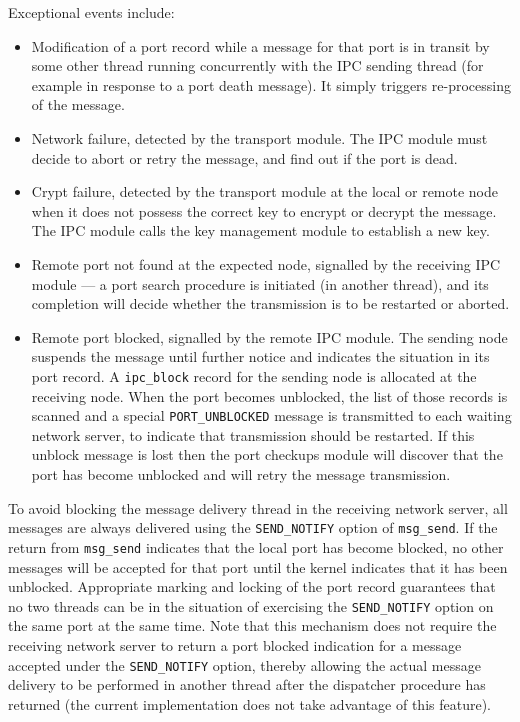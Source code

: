 Exceptional events include:
\begin{itemize} 
\item Modification of a port record while a message for that port is in 
transit by some other thread running concurrently with the IPC sending
thread (for example in response to a port death message).  It simply triggers
re-processing of the message.

\item Network failure, detected by the transport module. The IPC module must
decide to abort or retry the message, and find out if the port is dead.

\item Crypt failure, detected by the transport module at the local or remote
node when it does not possess the correct key to encrypt or decrypt the
message. The IPC module calls the key management module to establish a
new key.

\item Remote port not found at the expected node, signalled by the receiving
IPC module --- a port search procedure is initiated (in another
thread), and its completion will decide whether the transmission is to be
restarted or aborted.

\item Remote port blocked, signalled by the remote IPC module.  The
sending node suspends the message until further notice and indicates
the situation in its port record.  A \verb"ipc_block" record for the
sending node is allocated at the receiving node.  When the port
becomes unblocked, the list of those records is scanned and a special
\verb"PORT_UNBLOCKED" message is transmitted to each waiting network server,
to indicate that transmission should be restarted.  If this unblock
message is lost then the port checkups module will discover that the port
has become unblocked and will retry the message transmission.
\end{itemize}

To avoid blocking the message delivery thread in the receiving network
server, all messages are always delivered using the \verb"SEND_NOTIFY"
option of \verb"msg_send". If the return from \verb"msg_send"
indicates that the local port has become blocked, no other messages
will be accepted for that port until the kernel indicates that it has
been unblocked. Appropriate marking and locking of the port record
guarantees that no two threads can be in the situation of exercising
the \verb"SEND_NOTIFY" option on the same port at the same time. Note
that this mechanism does not require the receiving network server to
return a port blocked indication for a message accepted under the
\verb"SEND_NOTIFY" option, thereby allowing the actual message delivery to
be performed in another thread after the dispatcher procedure has
returned (the current implementation does not take advantage of this feature).

